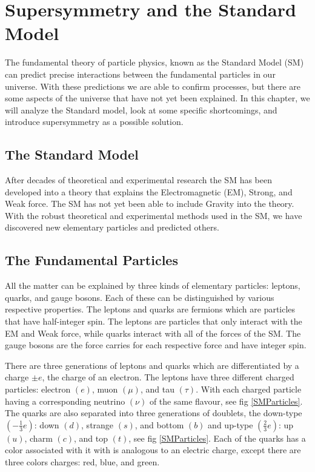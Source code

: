 \chapter{Supersymmetry and the Standard Model}
\label{ch:SUSY}

The fundamental theory of particle physics, known as the Standard Model (SM) can predict precise interactions between the fundamental particles in our universe. With these predictions we are able to confirm processes, but there are some aspects of the universe that have not yet been explained. In this chapter, we will analyze the Standard model, look at some specific shortcomings, and introduce supersymmetry as a possible solution.

\section{The Standard Model}
\label{sec:SM}

After decades of theoretical and experimental research the SM has been developed into a theory that explains the Electromagnetic (EM), Strong, and Weak force. The SM has not yet been able to include Gravity into the theory. With the robust theoretical and experimental methods used in the SM, we have discovered new elementary particles and predicted others. 

\section{The Fundamental Particles}

 All the matter can be explained by three kinds of elementary particles: leptons, quarks, and gauge bosons. Each of these can be distinguished by various respective properties. The leptons and quarks are fermions which are particles that have half-integer spin. The leptons are particles that only interact with the EM and Weak force, while quarks interact with all of the forces of the SM. The gauge bosons are the force carries for each respective force and have integer spin. 
 
 There are three generations of leptons and quarks which are differentiated by a charge $\pm e$, the charge of an electron. The leptons have three different charged particles: electron $(e)$, muon $(\mu)$, and tau $(\tau)$. With each charged particle having a corresponding neutrino $(\nu)$ of the same flavour, see fig \ref{SMParticles}. The quarks are also separated into three generations of doublets, the down-type $(-\frac{1}{3}e)$: down $(d)$, strange $(s)$, and bottom $(b)$ and up-type $(\frac{2}{3}e)$: up $(u)$, charm $(c)$, and top $(t)$, see fig \ref{SMParticles}. Each of the quarks has a color associated with it with is analogous to an electric charge, except there are three colors charges: red, blue, and green.  

